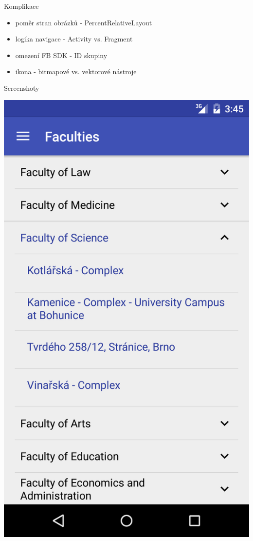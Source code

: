 \documentclass[pdf]{beamer}
\begin{document}
\begin{frame}{Komplikace}
 \begin{itemize}
   \item poměr stran obrázků - PercentRelativeLayout
   \item logika navigace - Activity vs. Fragment
   \item omezení FB SDK - ID skupiny
   \item ikona - bitmapové vs. vektorové nástroje
 \end{itemize}
\end{frame}

\begin{frame}{Screenshoty}
  \begin{center}
    \includegraphics[scale=0.1]{app-list}

\end{center}
\end{frame}
\end{document}
